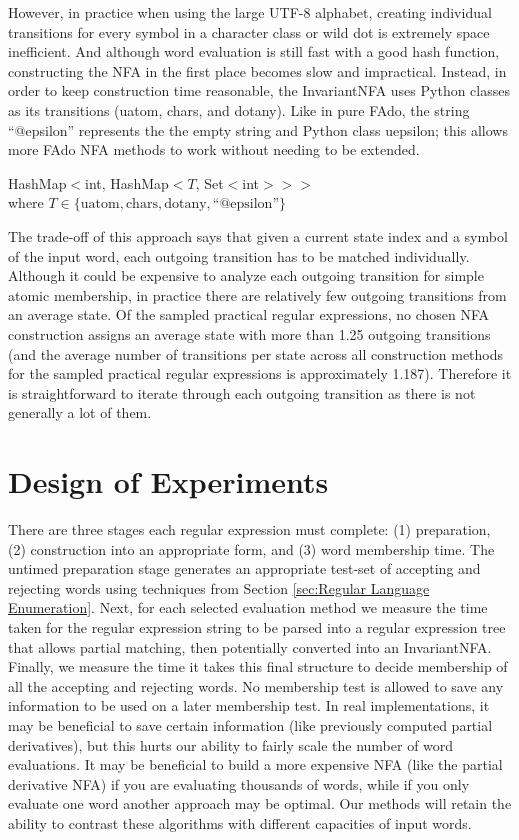 However, in practice when using the large UTF-8 alphabet, creating individual transitions for every symbol in a character class or wild dot is extremely space inefficient. And although word evaluation is still fast with a good hash function, constructing the NFA in the first place becomes slow and impractical. Instead, in order to keep construction time reasonable, the InvariantNFA uses Python classes as its transitions (uatom, chars, and dotany). Like in pure FAdo, the string ``@epsilon'' represents the the empty string and Python class uepsilon; this allows more FAdo NFA methods to work without needing to be extended.
\begin{center}
  HashMap$<$int, HashMap$<T$, Set$<$int$>>>$ \\
  where $T \in \{\textrm{uatom}, \textrm{chars}, \textrm{dotany}, \textrm{``@epsilon''}\}$
\end{center}

The trade-off of this approach says that given a current state index and a symbol of the input word, each outgoing transition has to be matched individually. Although it could be expensive to analyze each outgoing transition for simple atomic membership, in practice there are relatively few outgoing transitions from an average state. Of the sampled practical regular expressions, no chosen NFA construction assigns an average state with more than 1.25 outgoing transitions (and the average number of transitions per state across all construction methods for the sampled practical regular expressions is approximately 1.187). Therefore it is straightforward to iterate through each outgoing transition as there is not generally a lot of them.





\section{Design of Experiments}
\label{sec:Design of Experiments}
There are three stages each regular expression must complete: (1) preparation, (2) construction into an appropriate form, and (3) word membership time. The untimed preparation stage generates an appropriate test-set of accepting and rejecting words using techniques from Section \ref{sec:Regular Language Enumeration}. Next, for each selected evaluation method we measure the time taken for the regular expression string to be parsed into a regular expression tree that allows partial matching, then potentially converted into an InvariantNFA. Finally, we measure the time it takes this final structure to decide membership of all the accepting and rejecting words. No membership test is allowed to save any information to be used on a later membership test. In real implementations, it may be beneficial to save certain information (like previously computed partial derivatives), but this hurts our ability to fairly scale the number of word evaluations. It may be beneficial to build a more expensive NFA (like the partial derivative NFA) if you are evaluating thousands of words, while if you only evaluate one word another approach may be optimal. Our methods will retain the ability to contrast these algorithms with different capacities of input words.

